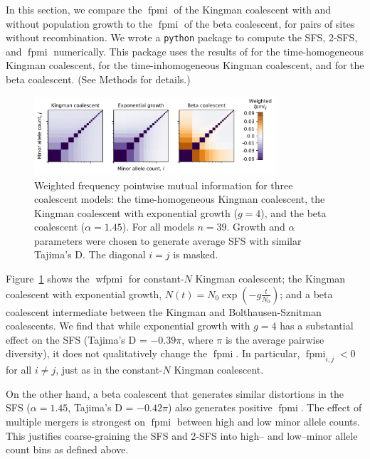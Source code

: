 \documentclass[11pt, letterpaper]{article}   	%
\newcommand{\Fig}[1]{Figure~\ref{#1}}
\DeclareMathOperator{\fpmi}{fpmi}
\DeclareMathOperator{\wfpmi}{wfpmi}
\begin{document}
In this section, we compare the $\fpmi$ of the Kingman coalescent with and without population growth to the $\fpmi$ of the beta coalescent, for pairs of sites without recombination.
We wrote a \texttt{python} package to compute the SFS, 2-SFS, and $\fpmi$ numerically.
This package uses the results of \cite{Fu1995} for the time-homogeneous Kingman coalescent, \cite{ZivkovicWiehe2008} for the time-inhomogeneous Kingman coalescent, and \cite{BirknerEtAl2013} for the beta coalescent.
(See Methods for details.)

\begin{figure}
\centering
\includegraphics[width=0.8\textwidth]{figures/figure1.pdf}
\caption{Weighted frequency pointwise mutual information for three coalescent models: the time-homogeneous Kingman coalescent, the Kingman coalescent with exponential growth ($g=4$), and the beta coalescent ($\alpha=1.45$). For all models $n=39$. Growth and $\alpha$ parameters were chosen to generate average SFS with similar Tajima's D. The diagonal $i=j$ is masked. \label{fig:nonrecombining_pmi}}
\end{figure}

\Fig{fig:nonrecombining_pmi} shows the $\wfpmi$ for constant-$N$ Kingman coalescent; the Kingman coalescent with exponential growth, $N(t)=N_0 \exp(-g \frac{t}{N_0})$; and a beta coalescent intermediate between the Kingman and Bolthausen-Sznitman coalescents.
We find that while exponential growth with $g=4$ has a substantial effect on the SFS (Tajima's D = $-0.39 \pi$, where $\pi$ is the average pairwise diversity), it does not qualitatively change the $\fpmi$.
In particular, $\fpmi_{i,j} < 0$ for all $i \neq j$, just as in the constant-$N$ Kingman coalescent.

On the other hand, a beta coalescent that generates similar distortions in the SFS ($\alpha=1.45$, Tajima's D = $-0.42 \pi$) also generates positive $\fpmi$.
The effect of multiple mergers is strongest on $\fpmi$ between high and low minor allele counts.
This justifies coarse-graining the SFS and 2-SFS into high-- and low--minor allele count bins as defined above.
\end{document}
